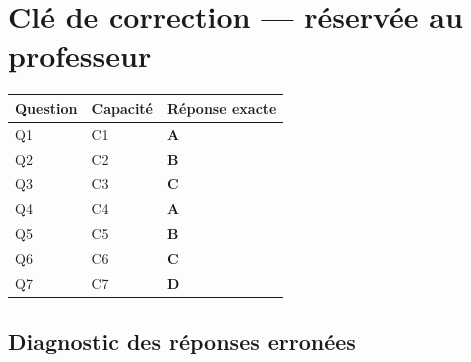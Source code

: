 \ifnxVersionProfesseur
\clearpage
\section*{Clé de correction — réservée au professeur}

\begin{center}
\begin{tabular}{lll}
\hline
Question & Capacité & Réponse exacte \\
\hline
Q1 & C1 & \textbf{A} \\
Q2 & C2 & \textbf{B} \\
Q3 & C3 & \textbf{C} \\
Q4 & C4 & \textbf{A} \\
Q5 & C5 & \textbf{B} \\
Q6 & C6 & \textbf{C} \\
Q7 & C7 & \textbf{D} \\
\hline
\end{tabular}
\end{center}

\subsection*{Diagnostic des réponses erronées}

